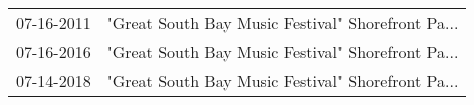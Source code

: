 \begin{supertabular}{ll}
 07-16-2011 &  "Great South Bay Music Festival" Shorefront Pa... \\
 07-16-2016 &  "Great South Bay Music Festival" Shorefront Pa... \\
 07-14-2018 &  "Great South Bay Music Festival" Shorefront Pa... \\
\end{supertabular}
